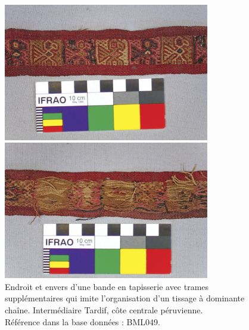 \documentclass[a4paper, twoside]{book}
\begin{document}
\begin{figure}[!h]
    \begin{minipage}[c]{.5\linewidth}
            \begin{center}
                \includegraphics[height=6cm,angle=-90]{../images/BML049_avant.jpg}
            \end{center}
    \end{minipage}
        \begin{minipage}[c]{.5\linewidth}
        \begin{center}
        		\includegraphics[height=6cm,angle=-90]{../images/BML049_arriere.jpg}
	\end{center}
    \end{minipage}
    \caption{Endroit et envers d'une bande en tapisserie avec trames supplémentaires qui imite l'organisation d'un tissage à dominante chaîne. Intermédiaire Tardif, côte centrale péruvienne. \\ Référence dans la base données : BML049.}
    \label{fig:BML049}   
\end{figure}
\end{document}
